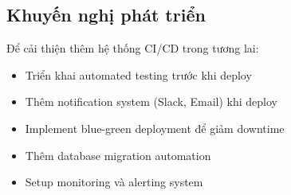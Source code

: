 \documentclass[12pt,a4paper]{article}
\begin{document}
\subsection{Khuyến nghị phát triển}

Để cải thiện thêm hệ thống CI/CD trong tương lai:

\begin{itemize}
    \item Triển khai automated testing trước khi deploy
    \item Thêm notification system (Slack, Email) khi deploy
    \item Implement blue-green deployment để giảm downtime
    \item Thêm database migration automation
    \item Setup monitoring và alerting system
\end{itemize}
\end{document}

